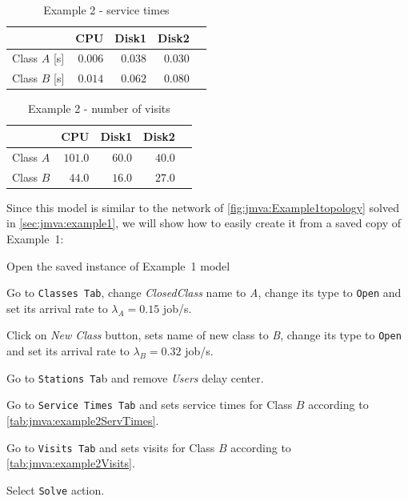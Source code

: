 \begin{table}[htbp]
\begin{center}
\begin{tabular}{c|r|r|r|r|}
& \multicolumn{1}{c|}{CPU} & \multicolumn{1}{c|}{Disk1} & \multicolumn{1}{c|}{Disk2} \\
\hline
Class $A$ [s]& $0.006$ & $0.038$ & $0.030$ \\
Class $B$ [s]& $0.014$ & $0.062$ & $0.080$ \\
\hline
\end{tabular}
\end{center}
\caption{Example 2 - service times}
\label{tab:jmva:example2ServTimes}
\end{table}

\begin{table}[htbp]
\begin{center}
\begin{tabular}{c|r|r|r|r|}
& \multicolumn{1}{c|}{CPU} & \multicolumn{1}{c|}{Disk1} & \multicolumn{1}{c|}{Disk2} \\
\hline
Class $A$ & $101.0$ & $60.0$ & $40.0$ \\
Class $B$ & $44.0$ & $16.0$ & $27.0$ \\
\hline
\end{tabular}
\end{center}
\caption{Example 2 - number of visits}
\label{tab:jmva:example2Visits}
\end{table}

Since this model is similar to the network of
\autoref{fig:jmva:Example1topology} solved in
\autoref{sec:jmva:example1}, we will show how to easily create it
from a saved copy of Example~1:
\begin{enumerate*}
    \item Open the saved instance of Example~1 model
    \item Go to \texttt{Classes Tab}, change \emph{ClosedClass} name
    to \emph{A}, change its type to \texttt{Open} and set its arrival
    rate to $\lambda_A = 0.15$ job/s.
    \item Click on \emph{New Class} button, sets name of new class to
    \emph{B}, change its type to \texttt{Open} and set its arrival
    rate to $\lambda_B = 0.32$ job/s.
    \item Go to \texttt{Stations Ta}b and remove \emph{Users} delay
    center.
    \item Go to \texttt{Service Times Tab} and sets service times for
    Class $B$ according to \autoref{tab:jmva:example2ServTimes}.
    \item Go to \texttt{Visits Tab} and sets visits for
    Class $B$ according to \autoref{tab:jmva:example2Visits}.
    \item Select \texttt{Solve} action.
\end{enumerate*}

